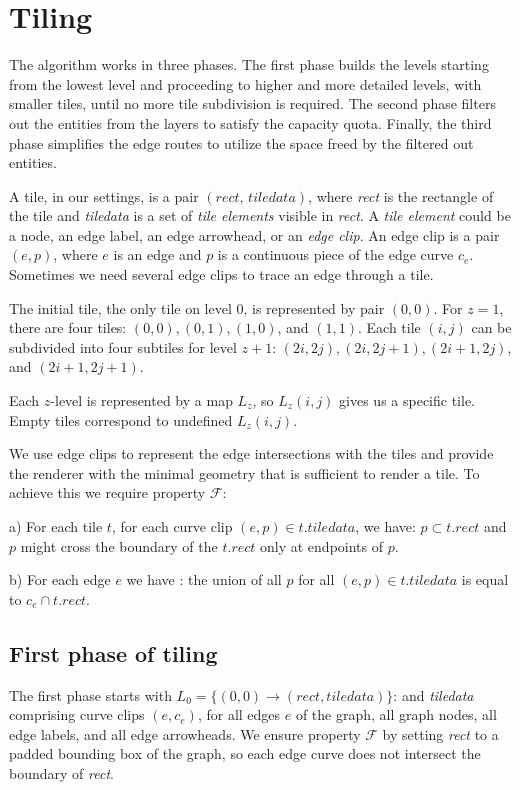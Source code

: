 \documentclass{gd-llncs}
\begin{document}
{\begin{table}
\end{table}
\section{Tiling}
The algorithm works in three phases. The first phase builds the levels starting from the lowest level and proceeding to higher and more detailed levels, with smaller tiles, until no more tile subdivision is required. The second phase filters out the entities from the layers to satisfy the capacity quota. Finally, the third phase simplifies the edge routes to utilize the space freed by the filtered out entities.


A tile, in our settings, is a pair $(\textit{rect, tiledata})$, where \textit{rect} is the rectangle of the tile and \textit{tiledata} is a set of \textit{tile elements} visible in \textit{rect}. A \textit{tile element} could be a node, an edge label, an edge arrowhead, or an \textit{edge clip}. An edge clip is a pair $(e, p)$, where $e$ is an edge and $p$ is a continuous piece of the edge curve $c_e$. Sometimes we need several edge clips to trace an edge through a tile.


The initial tile, the only tile on level $0$, is represented by pair $(0,0)$. For $z = 1$, there are four tiles: $(0,0),(0,1),(1,0)$, and $(1,1)$. Each tile $(i,j)$ can be subdivided into four subtiles for level $z+1$: $(2i,2j),(2i,2j+1), (2i+1,2j)$, and $(2i+1,2j+1)$.

Each $z$-level is represented by a map $L_z$, so $L_z(i, j)$ gives us a specific tile. Empty tiles correspond to undefined $L_z(i, j)$.

We use edge clips to represent the edge intersections with the tiles and provide the renderer with the minimal geometry that is sufficient to render a tile. To achieve this we require property $\mathcal{F}$:

a) For each tile $t$, for each curve clip $(e,p) \in t.\textit{tiledata}$, we have: $p \subset t.rect$ and $p$ might cross the boundary of the $t.rect$ only at endpoints of $p$.

b) For each edge $e$ we have : the union of all $p$ for all $(e,p) \in t.\textit{tiledata}$ is equal to $c_e \cap t.rect$.

\subsection*{First phase of tiling}

The first phase starts with $L_0 = \{(0,0) \rightarrow (\textit{rect},\textit{tiledata})\}$: and \textit{tiledata} comprising curve clips $(e,c_e)$, for all edges $e$ of the graph, all graph nodes, all edge labels, and all edge arrowheads. We ensure property $\mathcal{F}$ by setting \textit{rect} to a padded bounding box of the graph, so each edge curve does not intersect the boundary of \textit{rect}.

}
\end{document}
